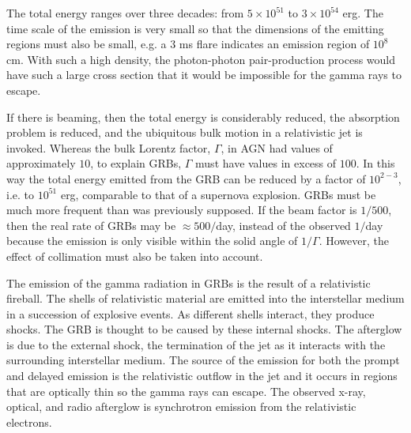 \documentclass[12pt,a4paper]{article}
\begin{document}
\cite{weekes2003very} The total energy ranges over three decades: from $5 \times 10^{51}$ to $3 \times 10^{54}$ erg. The time scale of the emission is very small so that the dimensions of the emitting regions must also be small, e.g. a $3$ ms flare indicates an emission region of $10^8$ cm. With such a high density, the photon-photon pair-production process would have such a large cross section that it would be impossible for the gamma rays to escape.

If there is beaming, then the total energy is considerably reduced, the absorption problem is reduced, and the ubiquitous bulk motion in a relativistic jet is invoked. Whereas the bulk Lorentz factor, $\Gamma$, in AGN had values of approximately $10$, to explain GRBs, $\Gamma$ must have values in excess of $100$. In this way the total energy emitted from the GRB can be reduced by a factor of $10^{2-3}$, i.e. to $10^{51}$ erg, comparable to that of a supernova explosion. GRBs must be much more frequent than was previously supposed. If the beam factor is $1/500$, then the real rate of GRBs may be $\approx 500/$day, instead of the observed $1/$day because the emission is only visible within the solid angle of $1/\Gamma$. However, the effect of collimation must also be taken into account.

The emission of the gamma radiation in GRBs is the result of a relativistic fireball. The shells of relativistic material are emitted into the interstellar medium in a succession of explosive events. As different shells interact, they produce shocks. The GRB is thought to be caused by these internal shocks. The afterglow is due to the external shock, the termination of the jet as it interacts with the surrounding interstellar medium. The source of the emission for both the prompt and delayed emission is the relativistic outflow in the jet and it occurs in regions that are optically thin so the gamma rays can escape. The observed x-ray, optical, and radio afterglow is synchrotron emission from the relativistic electrons.
\end{document}
